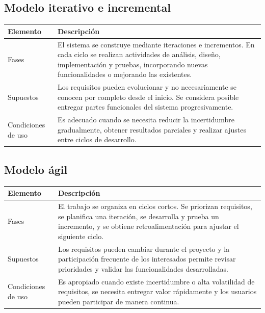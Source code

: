 \documentclass[11pt,a4paper]{article}
\begin{document}
	\subsection{Modelo iterativo e incremental}
	
	\begin{tabularx}{\textwidth}{|p{3.5cm}|Y|}
		\hline
		\textbf{Elemento} & \textbf{Descripción} \\ \hline
		Fases &
		El sistema se construye mediante iteraciones e incrementos. En cada ciclo se realizan actividades de análisis, diseño, implementación y pruebas, incorporando nuevas funcionalidades o mejorando las existentes. \\ \hline
		Supuestos &
		Los requisitos pueden evolucionar y no necesariamente se conocen por completo desde el inicio. Se considera posible entregar partes funcionales del sistema progresivamente. \\ \hline
		Condiciones de uso &
		Es adecuado cuando se necesita reducir la incertidumbre gradualmente, obtener resultados parciales y realizar ajustes entre ciclos de desarrollo. \\ \hline
	\end{tabularx}
	
	\subsection{Modelo ágil}
	
	\begin{tabularx}{\textwidth}{|p{3.5cm}|Y|}
		\hline
		\textbf{Elemento} & \textbf{Descripción} \\ \hline
		Fases &
		El trabajo se organiza en ciclos cortos. Se priorizan requisitos, se planifica una iteración, se desarrolla y prueba un incremento, y se obtiene retroalimentación para ajustar el siguiente ciclo. \\ \hline
		Supuestos &
		Los requisitos pueden cambiar durante el proyecto y la participación frecuente de los interesados permite revisar prioridades y validar las funcionalidades desarrolladas. \\ \hline
		Condiciones de uso &
		Es apropiado cuando existe incertidumbre o alta volatilidad de requisitos, se necesita entregar valor rápidamente y los usuarios pueden participar de manera continua. \\ \hline
	\end{tabularx}
	
	
\end{document}
